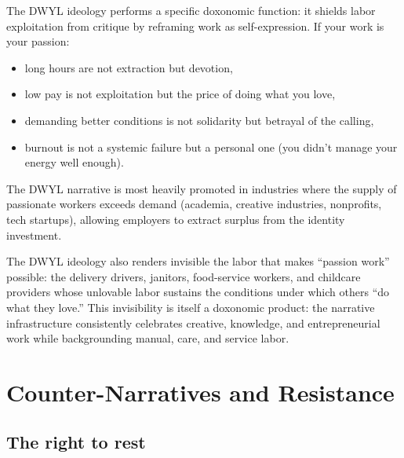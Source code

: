 \begin{proposition}
\label{prop:dwyl}
The DWYL ideology performs a specific doxonomic function: it shields labor exploitation from critique by reframing work as self-expression.
If your work is your passion:
\begin{itemize}[nosep]
  \item long hours are not extraction but devotion,
  \item low pay is not exploitation but the price of doing what you love,
  \item demanding better conditions is not solidarity but betrayal of the calling,
  \item burnout is not a systemic failure but a personal one (you didn't manage your energy well enough).
\end{itemize}
The DWYL narrative is most heavily promoted in industries where the supply of passionate workers exceeds demand (academia, creative industries, nonprofits, tech startups), allowing employers to extract surplus from the identity investment.
\end{proposition}

The DWYL ideology also renders invisible the labor that makes ``passion work'' possible: the delivery drivers, janitors, food-service workers, and childcare providers whose unlovable labor sustains the conditions under which others ``do what they love.''
This invisibility is itself a doxonomic product: the narrative infrastructure consistently celebrates creative, knowledge, and entrepreneurial work while backgrounding manual, care, and service labor.

\section{Counter-Narratives and Resistance}
\label{sec:ch26-counter}

\subsection{The right to rest}

